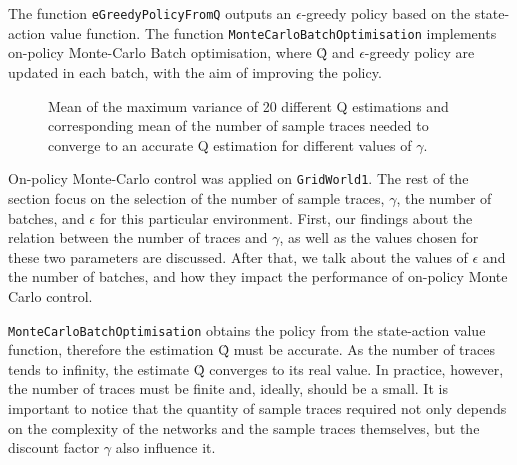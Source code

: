 \documentclass[10pt]{article}   	%
\begin{document}
The function \texttt{eGreedyPolicyFromQ} outputs an $\epsilon$-greedy policy based on the state-action value function. The function \texttt{MonteCarloBatchOptimisation} implements on-policy Monte-Carlo Batch optimisation, where \^{Q} and $\epsilon$-greedy policy are updated in each batch, with the aim of improving the policy. 

\begin{figure}[!h]
\centering
\setlength\fboxsep{0pt}
\setlength\fboxrule{0.6pt}
\caption{Mean of the maximum variance of 20 different Q estimations and corresponding mean of the number of sample traces needed to converge to an accurate Q estimation for different values of $\gamma$. \label{fig:maxvar}}
\end{figure}

On-policy Monte-Carlo control was applied on \texttt{GridWorld1}. The rest of the section focus on the selection of the number of sample traces, $\gamma$, the number of batches, and $\epsilon$ for this particular environment. First, our findings about the relation between the number of traces and $\gamma$, as well as the values chosen for these two parameters are discussed. After that, we talk about the values of $\epsilon$ and the number of batches, and how they impact the performance of on-policy Monte Carlo control.

\texttt{MonteCarloBatchOptimisation} obtains the policy from the state-action value function, therefore the estimation \^{Q} must be accurate. As the number of traces tends to infinity, the estimate \^{Q}  converges to its real value. In practice, however, the number of traces must be finite and, ideally, should be a small. It is important to notice that the quantity of sample traces required not only depends on the complexity of the networks and the sample traces themselves, but the discount factor $\gamma$ also influence it.
\end{document}
